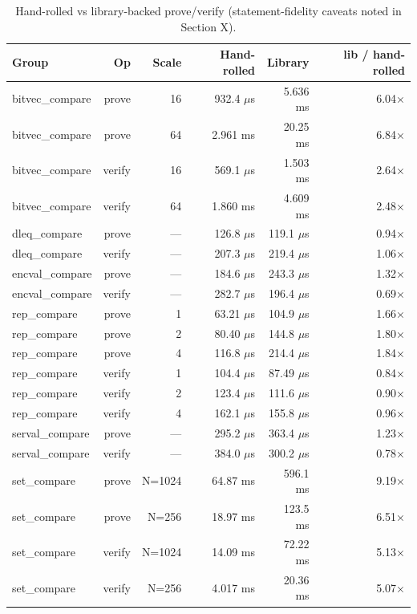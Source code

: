 \begin{table}[h]
  \centering
  \caption{Hand-rolled vs library-backed prove/verify (statement-fidelity caveats noted in Section X).}
  \label{tab:g5_handrolled_vs_lib}
  \begin{tabular}{lrrrrr}
    \toprule
    Group & Op & Scale & Hand-rolled & Library & lib / hand-rolled \\
    \midrule
bitvec\_compare & prove & 16 & 932.4 $\mu$s & 5.636 ms & 6.04× \\
bitvec\_compare & prove & 64 & 2.961 ms & 20.25 ms & 6.84× \\
bitvec\_compare & verify & 16 & 569.1 $\mu$s & 1.503 ms & 2.64× \\
bitvec\_compare & verify & 64 & 1.860 ms & 4.609 ms & 2.48× \\
dleq\_compare & prove & — & 126.8 $\mu$s & 119.1 $\mu$s & 0.94× \\
dleq\_compare & verify & — & 207.3 $\mu$s & 219.4 $\mu$s & 1.06× \\
encval\_compare & prove & — & 184.6 $\mu$s & 243.3 $\mu$s & 1.32× \\
encval\_compare & verify & — & 282.7 $\mu$s & 196.4 $\mu$s & 0.69× \\
rep\_compare & prove & 1 & 63.21 $\mu$s & 104.9 $\mu$s & 1.66× \\
rep\_compare & prove & 2 & 80.40 $\mu$s & 144.8 $\mu$s & 1.80× \\
rep\_compare & prove & 4 & 116.8 $\mu$s & 214.4 $\mu$s & 1.84× \\
rep\_compare & verify & 1 & 104.4 $\mu$s & 87.49 $\mu$s & 0.84× \\
rep\_compare & verify & 2 & 123.4 $\mu$s & 111.6 $\mu$s & 0.90× \\
rep\_compare & verify & 4 & 162.1 $\mu$s & 155.8 $\mu$s & 0.96× \\
serval\_compare & prove & — & 295.2 $\mu$s & 363.4 $\mu$s & 1.23× \\
serval\_compare & verify & — & 384.0 $\mu$s & 300.2 $\mu$s & 0.78× \\
set\_compare & prove & N=1024 & 64.87 ms & 596.1 ms & 9.19× \\
set\_compare & prove & N=256 & 18.97 ms & 123.5 ms & 6.51× \\
set\_compare & verify & N=1024 & 14.09 ms & 72.22 ms & 5.13× \\
set\_compare & verify & N=256 & 4.017 ms & 20.36 ms & 5.07× \\
    \bottomrule
  \end{tabular}
\end{table}
